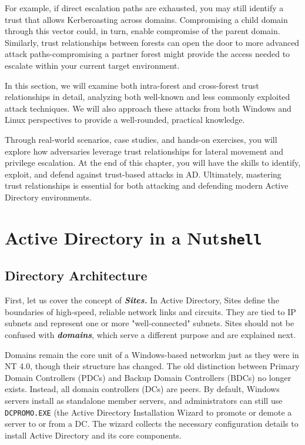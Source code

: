 For example, if direct escalation paths are exhausted, you may still identify a trust that allows Kerberoasting across domains. Compromising a child domain through this vector could, in turn, enable compromise of the parent domain. Similarly, trust relationships between forests can open the door to more advanced attack paths-compromising a partner forest might provide the access needed to escalate within your current target environment.

In this section, we will examine both intra-forest and cross-forest trust relationships in detail, analyzing both well-known and less commonly exploited attack techniques. We will also approach these attacks from both Windows and Linux perspectives to provide a well-rounded, practical knowledge.

Through real-world scenarios, case studies, and hands-on exercises, you will explore how adversaries leverage trust relationships for lateral movement and privilege escalation. At the end of this chapter, you will have the skills to identify, exploit, and defend against trust-based attacks in AD.
Ultimately, mastering trust relationships is essential for both attacking and defending modern Active Directory environments.

\section{Active Directory in a Nut\texttt{shell}}
\subsection{Directory Architecture}
First, let us cover the concept of \textbf{\textit{Sites.}} In Active Directory, Sites define the boundaries of high-speed, reliable network links and circuits. They are tied to IP subnets and represent one or more "well-connected" subnets. Sites should not be confused with \textbf{\textit{domains}}, which serve a different purpose and are explained next.

Domains remain the core unit of a Windows-based networkm just as they were in NT 4.0, though their structure has changed. The old distinction between Primary Domain Controllers (PDCs) and Backup Domain Controllers (BDCs) no longer exists. Instead, all domain controllers (DCs) are peers. By default, Windows servers install as standalone member servers, and administrators can still use \verb|DCPROMO.EXE| (the Active Directory Installation Wizard to promote or demote a server to or from a DC. The wizard collects the necessary configuration details to install Active Directory and its core components.

